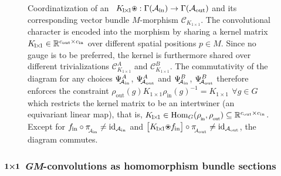 \begin{figure}
    \caption{\small
        Coordinatization of an \onexoneGM\ $K_{\!1\!\times\!1} \protect\ostar: \Gamma(\Ain) \to \Gamma(\Aout)$ and its corresponding vector bundle $M$-morphism $\mathcal{C}_{K_{\!1\!\times\!1}}$.
        The convolutional character is encoded into the morphism by sharing a kernel matrix $K_{\!1\!\times\!1}\in\mathbb{R}^{{c_\textup{out}}\times{c_\textup{in}}}$ over different spatial positions $p\in M$.
        Since no gauge is to be preferred, the kernel is furthermore shared over different trivializations
        $\mathcal{C}_{K_{\!1\!\times\!1}}^A$ and $\mathcal{C}_{K_{\!1\!\times\!1}}^B$.
        The commutativity of the diagram for any choices
        $\Psi_{\!\!\mathcal{A}_\text{in} }^A$,
        $\Psi_{\!\!\mathcal{A}_\text{out}}^A$ and
        $\Psi_{\!\!\mathcal{A}_\text{in} }^B$,
        $\Psi_{\!\!\mathcal{A}_\text{out}}^B$
        therefore enforces the constraint
        $\rho_\text{out}(g) K_{\!1\!\times\!1} \rho_\text{in}(g)^{-1} = K_{\!1\!\times\!1}\,\ \forall g\!\in G$
        which restricts the kernel matrix to be an intertwiner (an equivariant linear map), that is,
        $K_{\!1\!\times\!1} \in \Hom_G(\rhoin,\rhoout) \subseteq \R^{\cout\times\cin}$.
        Except for $\fin \circ \piAin \neq \id_{\Ain}$ and $\big[K_{\!1\!\times\!1} \protect\ostar \fin\big] \circ \piAout \neq \id_{\Aout}$, the diagram commutes.
    }
    \label{fig:triv_bundle_morphism_onexone}
\end{figure}










\subsubsection[\texorpdfstring{${1\kern-2.7pt\times\kern-2.9pt1}$}{1x1} \textit{GM}-convolutions as homomorphism bundle sections]%
              {\texorpdfstring{$\bm{1\kern-2.7pt\times\kern-2.9pt1}$}{1x1} \textit{GM}-convolutions as homomorphism bundle sections}
\label{sec:onexone_hom_section}


